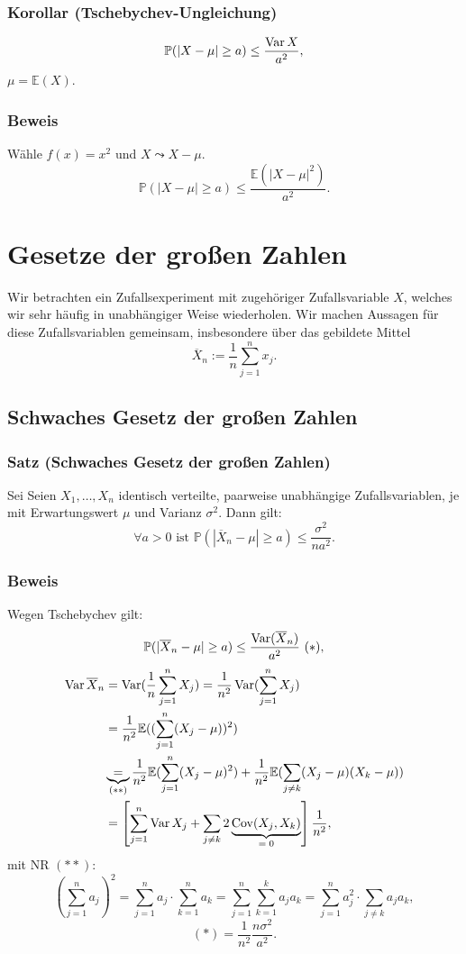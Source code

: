 \subsubsection{Korollar (Tschebychev-Ungleichung)}
\[
\mathbb{P}(|X-\mu|\geq a)\leq\frac{\operatorname{Var} X}{a^2},
\]
$\mu=\mathbb{E}(X)$.
\subsubsection{Beweis}
W\"ahle $f(x)=x^2$ und $X\leadsto X-\mu$.
\[
\mathbb{P}(|X-\mu|\geq a)\leq\frac{\mathbb{E}(|X-\mu|^2)}{a^2}.
\]
\newpage
\section{Gesetze der gro\ss{}en Zahlen}
Wir betrachten ein Zufallsexperiment mit zugeh\"origer Zufallsvariable $X$, welches wir sehr h\"aufig in unabh\"angiger Weise wiederholen. Wir machen Aussagen f\"ur diese Zufallsvariablen gemeinsam, insbesondere \"uber das gebildete Mittel
\[
\overline{X}_n:=\frac{1}{n}\sum_{j=1}^nx_j.
\]
\subsection{Schwaches Gesetz der gro\ss{}en Zahlen}
\subsubsection{Satz (Schwaches Gesetz der gro\ss{}en Zahlen)}
Sei Seien $X_1,\ldots,X_n$ identisch verteilte, paarweise unabh\"angige Zufallsvariablen, je mit Erwartungswert $\mu$ und Varianz $\sigma^2$. Dann gilt:
\[
\forall a>0\text{ ist }\mathbb{P}(|\overline{X}_n-\mu|\geq a)\leq\frac{\sigma^2}{na^2}.
\]
\subsubsection{Beweis}
Wegen Tschebychev gilt:
\[
\mathbb{P}(|\overline{X}_n-\mu|\geq a)\leq\frac{\operatorname{Var}(\overline{X}_n)}{a^2}\ (*),
\]
\begin{align*}
\Var\overline{X}_n&=\Var(\frac{1}{n}\sum_{j=1}^n X_j)=\frac{1}{n^2}\Var(\sum_{j=1}^n X_j)\\
&=\frac{1}{n^2}\mathbb{E}((\sum_{j=1}^n(X_j-\mu))^2)\\
&\ubr{=}{$(**)$}\frac{1}{n^2}\mathbb{E}(\sum_{j=1}^n(X_j-\mu)^2)+\frac{1}{n^2}\mathbb{E}(\sum_{j\neq k}(X_j-\mu)(X_k-\mu))\\
&=\left[\sum_{j=1}^n\Var X_j+\sum_{j\neq k}2\ubr{\Cov(X_j,X_k)}{$=0$}\right]\frac{1}{n^2},
\end{align*}
mit NR $(**)$:
\[
\left(\sum_{j=1}^na_j\right)^2
=\sum_{j=1}^na_j\cdot\sum_{k=1}^na_k
=\sum_{j=1}^n\sum_{k=1}^ka_ja_k
=\sum_{j=1}^na_j^2\cdot\sum_{j\neq k}a_ja_k,
\]
\[
(*)=\frac{1}{n^2}\frac{n\sigma^2}{a^2}.
\]

